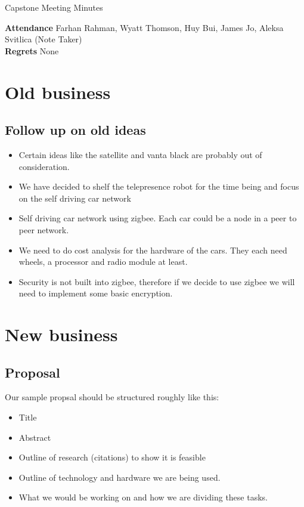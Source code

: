 \documentclass[a4paper]{article}
\begin{document}
	\begin{center}
		\huge Capstone Meeting Minutes
	\end{center}
	\textbf{Attendance} Farhan Rahman, Wyatt Thomson, Huy Bui, James Jo, Aleksa Svitlica (Note Taker) \\
	\textbf{Regrets} None \\

	\section{Old business}
	\subsection{Follow up on old ideas}
	\begin{itemize}
		\item Certain ideas like the satellite and vanta black are probably out of consideration.
		\item We have decided to shelf the telepresence robot for the time being and focus on the self driving car network
		\item Self driving car network using zigbee. Each car could be a node in a peer to peer network.
		\item We need to do cost analysis for the hardware of the cars. They each need wheels, a processor and radio module at least.
		\item Security is not built into zigbee, therefore if we decide to use zigbee we will need to implement some basic encryption.
	\end{itemize}

	\section{New business}
	\subsection{Proposal}
	Our sample propsal should be structured roughly like this:
	\begin{itemize}
		\item Title
		\item Abstract
		\item Outline of research (citations) to show it is feasible
		\item Outline of technology and hardware we are being used.
		\item What we would be working on and how we are dividing these tasks.
	\end{itemize}
\end{document}
